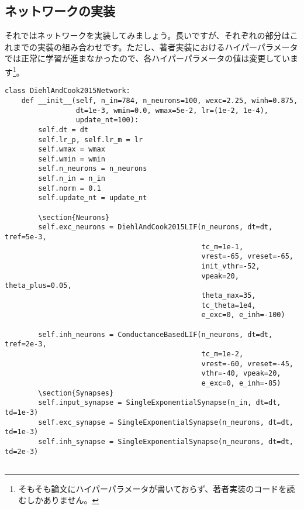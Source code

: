\subsection{ネットワークの実装}
それではネットワークを実装してみましょう。長いですが、それぞれの部分はこれまでの実装の組み合わせです。ただし、著者実装におけるハイパーパラメータでは正常に学習が進まなかったので、各ハイパーパラメータの値は変更しています\footnote{そもそも論文にハイパーパラメータが書いておらず、著者実装のコードを読むしかありません。}。
\begin{verbatim}
class DiehlAndCook2015Network:
    def __init__(self, n_in=784, n_neurons=100, wexc=2.25, winh=0.875,
                 dt=1e-3, wmin=0.0, wmax=5e-2, lr=(1e-2, 1e-4),
                 update_nt=100):
        self.dt = dt
        self.lr_p, self.lr_m = lr
        self.wmax = wmax
        self.wmin = wmin
        self.n_neurons = n_neurons
        self.n_in = n_in
        self.norm = 0.1
        self.update_nt = update_nt

        \section{Neurons}
        self.exc_neurons = DiehlAndCook2015LIF(n_neurons, dt=dt, tref=5e-3,
                                               tc_m=1e-1,
                                               vrest=-65, vreset=-65, 
                                               init_vthr=-52,
                                               vpeak=20, theta_plus=0.05,
                                               theta_max=35,
                                               tc_theta=1e4,
                                               e_exc=0, e_inh=-100)

        self.inh_neurons = ConductanceBasedLIF(n_neurons, dt=dt, tref=2e-3,
                                               tc_m=1e-2,
                                               vrest=-60, vreset=-45,
                                               vthr=-40, vpeak=20,
                                               e_exc=0, e_inh=-85)
        \section{Synapses}
        self.input_synapse = SingleExponentialSynapse(n_in, dt=dt, td=1e-3)
        self.exc_synapse = SingleExponentialSynapse(n_neurons, dt=dt, td=1e-3)
        self.inh_synapse = SingleExponentialSynapse(n_neurons, dt=dt, td=2e-3)
        

\end{verbatim}
